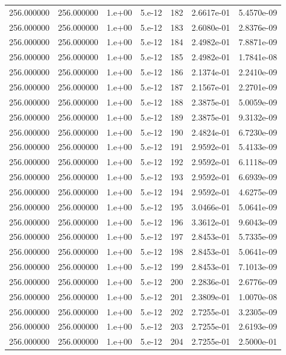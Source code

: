 \begin{table}[htbp]
\begin{tabular}{rrrrrrr}
256.000000 & 256.000000 & 1.e+00 & 5.e-12 & 182 & 2.6617e-01 & 5.4570e-09 \\
256.000000 & 256.000000 & 1.e+00 & 5.e-12 & 183 & 2.6080e-01 & 2.8376e-09 \\
256.000000 & 256.000000 & 1.e+00 & 5.e-12 & 184 & 2.4982e-01 & 7.8871e-09 \\
256.000000 & 256.000000 & 1.e+00 & 5.e-12 & 185 & 2.4982e-01 & 1.7841e-08 \\
256.000000 & 256.000000 & 1.e+00 & 5.e-12 & 186 & 2.1374e-01 & 2.2410e-09 \\
256.000000 & 256.000000 & 1.e+00 & 5.e-12 & 187 & 2.1567e-01 & 2.2701e-09 \\
256.000000 & 256.000000 & 1.e+00 & 5.e-12 & 188 & 2.3875e-01 & 5.0059e-09 \\
256.000000 & 256.000000 & 1.e+00 & 5.e-12 & 189 & 2.3875e-01 & 9.3132e-09 \\
256.000000 & 256.000000 & 1.e+00 & 5.e-12 & 190 & 2.4824e-01 & 6.7230e-09 \\
256.000000 & 256.000000 & 1.e+00 & 5.e-12 & 191 & 2.9592e-01 & 5.4133e-09 \\
256.000000 & 256.000000 & 1.e+00 & 5.e-12 & 192 & 2.9592e-01 & 6.1118e-09 \\
256.000000 & 256.000000 & 1.e+00 & 5.e-12 & 193 & 2.9592e-01 & 6.6939e-09 \\
256.000000 & 256.000000 & 1.e+00 & 5.e-12 & 194 & 2.9592e-01 & 4.6275e-09 \\
256.000000 & 256.000000 & 1.e+00 & 5.e-12 & 195 & 3.0466e-01 & 5.0641e-09 \\
256.000000 & 256.000000 & 1.e+00 & 5.e-12 & 196 & 3.3612e-01 & 9.6043e-09 \\
256.000000 & 256.000000 & 1.e+00 & 5.e-12 & 197 & 2.8453e-01 & 5.7335e-09 \\
256.000000 & 256.000000 & 1.e+00 & 5.e-12 & 198 & 2.8453e-01 & 5.0641e-09 \\
256.000000 & 256.000000 & 1.e+00 & 5.e-12 & 199 & 2.8453e-01 & 7.1013e-09 \\
256.000000 & 256.000000 & 1.e+00 & 5.e-12 & 200 & 2.2836e-01 & 2.6776e-09 \\
256.000000 & 256.000000 & 1.e+00 & 5.e-12 & 201 & 2.3809e-01 & 1.0070e-08 \\
256.000000 & 256.000000 & 1.e+00 & 5.e-12 & 202 & 2.7255e-01 & 3.2305e-09 \\
256.000000 & 256.000000 & 1.e+00 & 5.e-12 & 203 & 2.7255e-01 & 2.6193e-09 \\
256.000000 & 256.000000 & 1.e+00 & 5.e-12 & 204 & 2.7255e-01 & 2.5000e-01 \\

\end{tabular}
\end{table}

